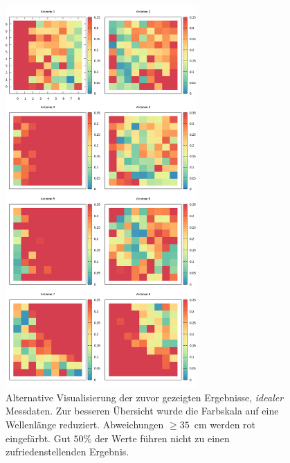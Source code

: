 %
%

\begin{figure}[!ht]
	\centering
	\caption[Limitierte Ergebnisse - Ideale Messwerte]{ Alternative Visualisierung der zuvor gezeigten Ergebnisse, \textit{idealer} Messdaten. Zur besseren Übersicht wurde die Farbskala auf eine Wellenlänge reduziert. Abweichungen $\ge35$~cm werden rot eingefärbt. Gut $50\%$ der Werte führen nicht zu einen zufriedenstellenden Ergebnis. }
	\label{fig:results4}
	\vspace{3mm}
	\includegraphics[width=0.65\textwidth]{img/limitedIdeal.png}
	

\end{figure}
%
